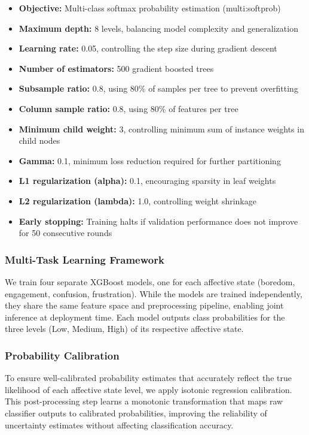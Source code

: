 \documentclass[11pt,a4paper]{article}
\begin{document}
\begin{itemize}
    \item \textbf{Objective:} Multi-class softmax probability estimation (multi:softprob)
    \item \textbf{Maximum depth:} 8 levels, balancing model complexity and generalization
    \item \textbf{Learning rate:} 0.05, controlling the step size during gradient descent
    \item \textbf{Number of estimators:} 500 gradient boosted trees
    \item \textbf{Subsample ratio:} 0.8, using 80\% of samples per tree to prevent overfitting
    \item \textbf{Column sample ratio:} 0.8, using 80\% of features per tree
    \item \textbf{Minimum child weight:} 3, controlling minimum sum of instance weights in child nodes
    \item \textbf{Gamma:} 0.1, minimum loss reduction required for further partitioning
    \item \textbf{L1 regularization (alpha):} 0.1, encouraging sparsity in leaf weights
    \item \textbf{L2 regularization (lambda):} 1.0, controlling weight shrinkage
    \item \textbf{Early stopping:} Training halts if validation performance does not improve for 50 consecutive rounds
\end{itemize}

\subsubsection{Multi-Task Learning Framework}

We train four separate XGBoost models, one for each affective state (boredom, engagement, confusion, frustration). While the models are trained independently, they share the same feature space and preprocessing pipeline, enabling joint inference at deployment time. Each model outputs class probabilities for the three levels (Low, Medium, High) of its respective affective state.

\subsubsection{Probability Calibration}

To ensure well-calibrated probability estimates that accurately reflect the true likelihood of each affective state level, we apply isotonic regression calibration. This post-processing step learns a monotonic transformation that maps raw classifier outputs to calibrated probabilities, improving the reliability of uncertainty estimates without affecting classification accuracy.
\end{document}
